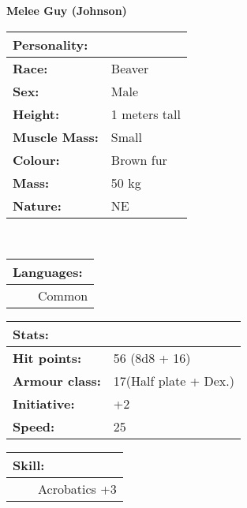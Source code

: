 \documentclass[11pt]{article}
\newcommand{\tabitem}{~~\llap{--}~~}
\begin{document}
	\begin{center}
\Huge \textbf{Melee Guy (Johnson)}
	\end{center}
	\begin{multicols}{2}
\noindent \begin{tabularx}{\linewidth}{@{}l l}
\Large \textbf{Personality:} 	& 						\\
\hline
\textbf{Race:} 					& Beaver	 			\\
\textbf{Sex:} 					& Male 					\\
\textbf{Height:} 				& 1 meters tall		 	\\
\textbf{Muscle Mass:} 			& Small 				\\
\textbf{Colour:} 				& Brown fur			 	\\
\textbf{Mass:} 					& 50 kg			 		\\
\textbf{Nature:} 				& NE
		\end{tabularx} \\

\vspace{4mm}

\noindent \begin{tabularx}{\linewidth}{@{}l}
{\Large \textbf{Languages:}} \\
\hline
\tabitem Common \\
		\end{tabularx}

\vspace{4mm}

\noindent \begin{tabularx}{\linewidth}{@{}l l}
\Large \textbf{Stats:}		 	& 									\\
\hline
\textbf{Hit points:} 			& 56 (8d8 + 16) 					\\
\textbf{Armour class:} 			& 17(Half plate + Dex.)	 		\\
\textbf{Initiative:} 			& +2								\\
\textbf{Speed:} 				& 25		 						\\
		\end{tabularx}

\vspace{4mm}

\noindent \begin{tabularx}{\linewidth}{@{}l}
{\Large \textbf{Skill:}} \\
\hline
\tabitem Acrobatics +3 \\
		\end{tabularx}

\vspace{4mm}


\end{multicols}
\end{document}
